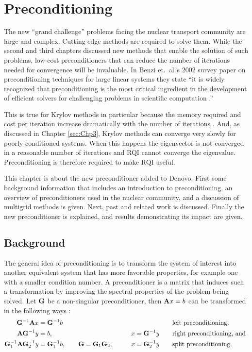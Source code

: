 
\chapter{Preconditioning}
\label{sec:Chp4}
The new ``grand challenge'' problems facing the nuclear transport community are large and complex. Cutting edge methods are required to solve them. While the second and third chapters discussed new methods that enable the solution of such problems, low-cost preconditioners that can reduce the number of iterations needed for convergence will be invaluable. In Benzi et.\ al.'s 2002 survey paper on preconditioning techniques for large linear systems they state ``it is widely recognized that preconditioning is the most critical ingredient in the development of efficient solvers for challenging problems in scientific computation \cite{Benzi2002}.'' 

This is true for Krylov methods in particular because the memory required and cost per iteration increase dramatically with the number of iterations \cite{Benzi2002}. And, as discussed in Chapter \ref{sec:Chp3}, Krylov methods can converge very slowly for poorly conditioned systems. When this happens the eigenvector is not converged in a reasonable number of iterations and RQI cannot converge the eigenvalue. Preconditioning is therefore required to make RQI useful. 

This chapter is about the new preconditioner added to Denovo. First some background information that includes an introduction to preconditioning, an overview of preconditioners used in the nuclear community, and a discussion of multigrid methods is given. Next, past and related work is discussed. Finally the new preconditioner is explained, and results demonstrating its impact are given. 

\section{Background}
The general idea of preconditioning is to transform the system of interest into another equivalent system that has more favorable properties, for example one with a smaller condition number. A preconditioner is a matrix that induces such a transformation by improving the spectral properties of the problem being solved. Let $\mathbf{G}$ be a non-singular preconditioner, then $\mathbf{A}x=b$ can be transformed in the following ways \cite{Benzi2002}: 
%
\begin{alignat}{3}
  \mathbf{G}^{-1}\mathbf{A}x &= \mathbf{G}^{-1}b  &  &\text{left preconditioning,} \\
  \mathbf{AG}^{-1}y &= b, \qquad  &x = \mathbf{G}^{-1}y \qquad &\text{right preconditioning, and } \\
  \mathbf{G}_{1}^{-1}\mathbf{AG}_{2}^{-1}y &= \mathbf{G}_{1}^{-1}b, \qquad \mathbf{G} = \mathbf{G}_{1}\mathbf{G}_{2}, \qquad  &x = \mathbf{G}_{2}^{-1}y  \qquad &\text{split preconditioning.} 
\end{alignat}

